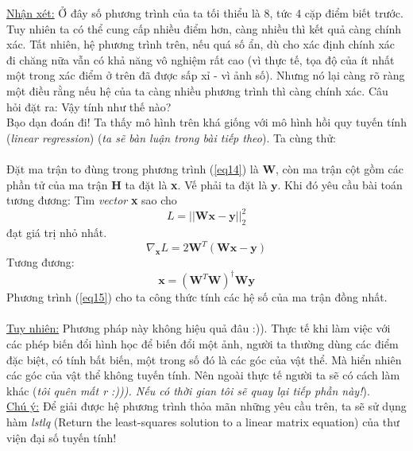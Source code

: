 \documentclass{article}
\begin{document}
\underline{Nhận xét:} Ở đây số phương trình của ta tối thiểu là 8, tức 4 cặp điểm biết trước. Tuy nhiên ta có thể cung cấp nhiều điểm hơn, càng nhiều thì kết quả càng chính xác. Tất nhiên, hệ phương trình trên, nếu quá số ẩn, dù cho xác định chính xác đi chăng nữa vẫn có khả năng vô nghiệm rất cao (vì thực tế, tọa độ của ít nhất một trong xác điểm ở trên đã được sấp xỉ - vì ảnh số). Nhưng nó lại càng rõ ràng một điều rằng nếu hệ của ta càng nhiều phương trình thì càng chính xác. Câu hỏi đặt ra: Vậy tính như thế nào?\\ 
Bạo dạn đoán đi! Ta thấy mô hình trên khá giống với mô hình hồi quy tuyến tính (\textit{linear regression}) (\textit{ta sẽ bàn luận trong bài tiếp theo}). Ta cùng thử:\\\\
Đặt ma trận to đùng trong phương trình (\ref{eq14}) là \textbf{W}, còn ma trận cột gồm các phần tử của ma trận \textbf{H} ta đặt là \textbf{x}. Vế phải ta đặt là $\textbf{y}$. Khi đó yêu cầu bài toán tương đương: Tìm \textit{vector} \textbf{x} sao cho $$L = ||\textbf{W}\textbf{x}-\textbf{y}||_{2}^{2} $$ đạt giá trị nhỏ nhất.\\
$$\nabla_{\textbf{x}}L = 2\mbox{}\textbf{W}^{T}(\textbf{W}\textbf{x}-\textbf{y})$$
Tương đương:
\begin{equation}
    \textbf{x} = (\textbf{W}^{T}\textbf{W})^{\dagger}\mbox{}\textbf{W}\textbf{y}
\label{eq15}
\end{equation}
Phương trình (\ref{eq15}) cho ta công thức tính các hệ số của ma trận đồng nhất.\\\\
\underline{Tuy nhiên:} Phương pháp này không hiệu quả đâu :)). Thực tế khi làm việc với các phép biến đổi hình học để biến đổi một ảnh, người ta thường dùng các điểm đặc biệt, có tính bất biến, một trong số đó là các góc của vật thể. Mà hiển nhiên các góc của vật thể không tuyến tính. Nên ngoài thực tế người ta sẽ có cách làm khác (\textit{tôi quên mất r :))). Nếu có thời gian tôi sẽ quay lại tiếp phần này!}).\\
\underline{Chú ý:} Để giải được hệ phương trình thỏa mãn những yêu cầu trên, ta sẽ sử dụng hàm \textit{lstlq} (Return the least-squares solution to a linear matrix equation) của thư viện đại số tuyến tính!
\end{document}
